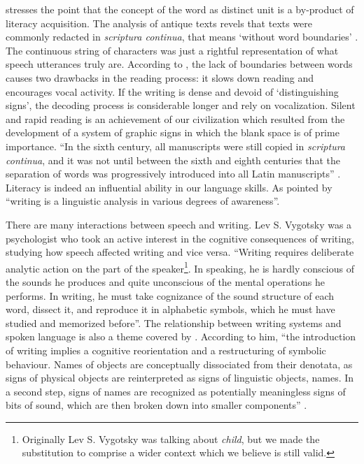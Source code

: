 \cite{olson1994} stresses the point
that the concept of the word as distinct unit is a by-product of literacy acquisition.
The analysis of antique texts revels that texts were commonly redacted in \textit{scriptura continua},
that means `without word boundaries' \citep{saenger}. The continuous string of characters 
was just a rightful representation of what speech utterances truly are.
According to \cite{saenger1997}, the lack of boundaries between words causes 
two drawbacks in the reading process: it slows down reading and encourages vocal activity.
If the writing is dense and devoid of `distinguishing signs', the decoding process
is considerable longer and rely on vocalization. Silent and rapid reading is an achievement 
of our civilization which resulted from the development of a system of graphic signs in which
the blank space is of prime importance. ``In the sixth century, all manuscripts were still copied
in \textit{scriptura continua}, and it was not until between the sixth and eighth centuries that the
separation of words was progressively introduced into all Latin manuscripts'' \citep{pombo2002}. 
Literacy is indeed an influential ability in our language skills. As pointed by \cite{hagege1986}
``writing is a linguistic analysis in various degrees of awareness''.

There are many interactions between speech and writing. Lev S. Vygotsky was a
psychologist who took an active interest in the cognitive consequences of writing,
studying how speech affected writing and vice versa. 
``Writing requires deliberate analytic action on the part of the speaker\footnote{Originally Lev S. Vygotsky was talking about \textit{child}, but we made the substitution to comprise a wider context which
we believe is still valid.}.
In speaking, he is hardly conscious of the sounds he produces and quite unconscious of
the mental operations he performs. In writing, he must take cognizance of the
sound structure of each word, dissect it, and reproduce it in alphabetic symbols,
which he must have studied and memorized before''\citep{vygotsky}.
The relationship between writing systems and spoken language is also a theme covered
by \cite{coulmas}. According to him, ``the introduction of writing implies a 
cognitive reorientation and a restructuring of symbolic behaviour. Names of objects
are conceptually dissociated from their denotata, as signs of physical objects are
reinterpreted as signs of linguistic objects, names. In a second step, signs of names
are recognized as potentially meaningless signs of bits of sound, which are then
broken down into smaller components'' \citep{coulmas}.

